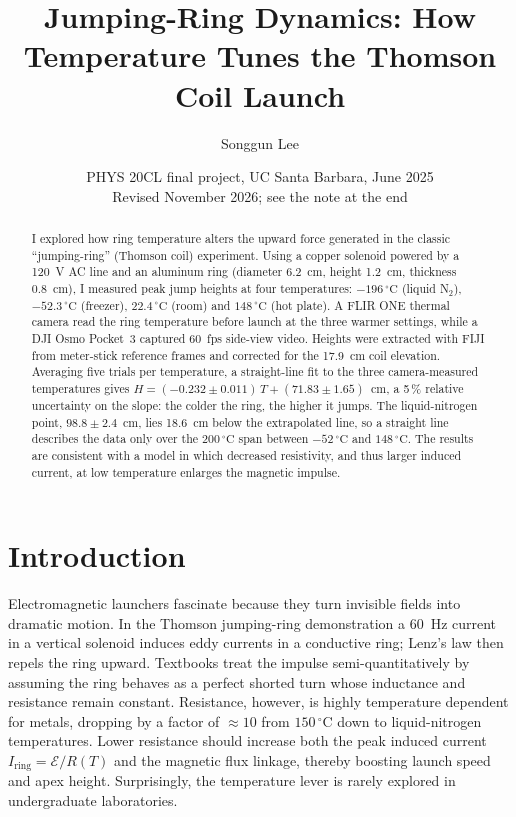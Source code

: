 \documentclass[11pt]{article}
\title{Jumping-Ring Dynamics: How Temperature Tunes the Thomson Coil Launch}
\author{Songgun Lee}
\date{PHYS 20CL final project, UC Santa Barbara, June 2025\\[2pt]
{\small Revised November 2026; see the note at the end}}
\newcommand{\tC}[1]{$#1\,^{\circ}\mathrm{C}$}
\begin{document}
\maketitle

\begin{abstract}
\noindent
I explored how ring temperature alters the upward force generated in the classic ``jumping-ring''
(Thomson coil) experiment. Using a copper solenoid powered by a 120~V AC line and an aluminum ring
(diameter 6.2~cm, height 1.2~cm, thickness 0.8~cm), I measured peak jump heights at four
temperatures: \tC{-196} (liquid N$_2$), \tC{-52.3} (freezer), \tC{22.4} (room) and \tC{148} (hot
plate). A FLIR ONE thermal camera read the ring temperature before launch at the three warmer
settings, while a DJI Osmo Pocket~3 captured 60~fps side-view video. Heights were extracted with
FIJI from meter-stick reference frames and corrected for the 17.9~cm coil elevation. Averaging five
trials per temperature, a straight-line fit to the three camera-measured temperatures gives
$H = (-0.232 \pm 0.011)\,T + (71.83 \pm 1.65)$~cm, a 5\,\% relative uncertainty on the slope: the
colder the ring, the higher it jumps. The liquid-nitrogen point, $98.8 \pm 2.4$~cm, lies 18.6~cm
below the extrapolated line, so a straight line describes the data only over the \tC{200} span between \tC{-52} and \tC{148}. The results are consistent with a model in which decreased resistivity, and
thus larger induced current, at low temperature enlarges the magnetic impulse.
\end{abstract}

\section*{Introduction}

Electromagnetic launchers fascinate because they turn invisible fields into dramatic motion. In the
Thomson jumping-ring demonstration a 60~Hz current in a vertical solenoid induces eddy currents in a
conductive ring; Lenz's law then repels the ring upward. Textbooks treat the impulse
semi-quantitatively by assuming the ring behaves as a perfect shorted turn whose inductance and
resistance remain constant. Resistance, however, is highly temperature dependent for metals,
dropping by a factor of $\approx 10$ from \tC{150} down to liquid-nitrogen temperatures. Lower
resistance should increase both the peak induced current $I_\mathrm{ring} = \mathcal{E}/R(T)$ and
the magnetic flux linkage, thereby boosting launch speed and apex height. Surprisingly, the
temperature lever is rarely explored in undergraduate laboratories.
\end{document}
